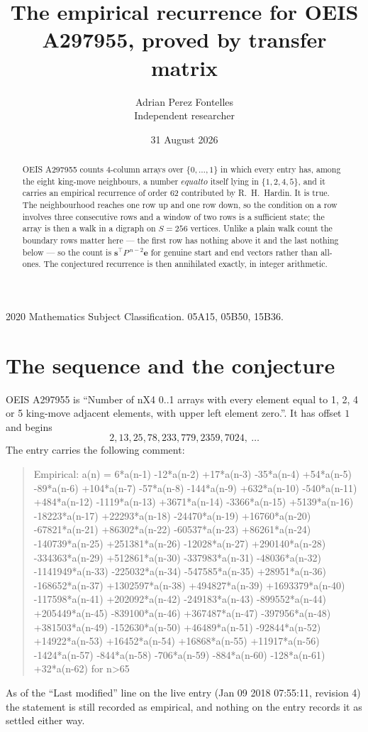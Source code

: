 \documentclass[11pt,a4paper]{article}
\title{The empirical recurrence for OEIS A297955, proved by transfer matrix}
\author{Adrian Perez Fontelles\\ \small Independent researcher}
\date{31 August 2026}
\theoremstyle{plain}
\theoremstyle{definition}
\begin{document}
\maketitle

\begin{abstract}
OEIS A297955 counts $4$-column arrays over $\{0,\dots,1\}$ in which every entry has,
among the eight king-move neighbours, a number $equal to$ itself lying in $\{1,2,4,5\}$, and it carries an empirical
recurrence of order $62$ contributed by R.~H.~Hardin. It is true. The neighbourhood
reaches one row up and one row down, so the condition on a row involves three consecutive
rows and a window of two rows is a sufficient state; the array is then a walk in a digraph
on $S=256$ vertices. Unlike a plain walk count the boundary rows matter here --- the first
row has nothing above it and the last nothing below --- so the count is
$\mathbf{s}^{\!\top}P^{\,n-2}\mathbf{e}$ for genuine start and end vectors rather than
all-ones. The conjectured recurrence is then annihilated exactly, in integer arithmetic.
\end{abstract}

\noindent\small 2020 Mathematics Subject Classification. 05A15, 05B50, 15B36.\normalsize

\section{The sequence and the conjecture}

OEIS A297955 is ``Number of nX4 0..1 arrays with every element equal to 1, 2, 4 or 5 king-move adjacent elements, with upper left element zero.''. It has offset
$1$ and begins
\[
2, 13, 25, 78, 233, 779, 2359, 7024,\ \dots
\]
The entry carries the following comment:
\begin{quote}\small
Empirical: a(n) = 6*a(n-1) -12*a(n-2) +17*a(n-3) -35*a(n-4) +54*a(n-5) -89*a(n-6) +104*a(n-7) -57*a(n-8) -144*a(n-9) +632*a(n-10) -540*a(n-11) +484*a(n-12) -1119*a(n-13) +3671*a(n-14) -3366*a(n-15) +5139*a(n-16) -18223*a(n-17) +22293*a(n-18) -24470*a(n-19) +16760*a(n-20) -67821*a(n-21) +86302*a(n-22) -60537*a(n-23) +86261*a(n-24) -140739*a(n-25) +251381*a(n-26) -12028*a(n-27) +290140*a(n-28) -334363*a(n-29) +512861*a(n-30) -337983*a(n-31) -48036*a(n-32) -1141949*a(n-33) -225032*a(n-34) -547585*a(n-35) +28951*a(n-36) -168652*a(n-37) +1302597*a(n-38) +494827*a(n-39) +1693379*a(n-40) -117598*a(n-41) +202092*a(n-42) -249183*a(n-43) -899552*a(n-44) +205449*a(n-45) -839100*a(n-46) +367487*a(n-47) -397956*a(n-48) +381503*a(n-49) -152630*a(n-50) +46489*a(n-51) -92844*a(n-52) +14922*a(n-53) +16452*a(n-54) +16868*a(n-55) +11917*a(n-56) -1424*a(n-57) -844*a(n-58) -706*a(n-59) -884*a(n-60) -128*a(n-61) +32*a(n-62) for n>65
\end{quote}
As of the ``Last modified'' line on the live entry (Jan 09 2018 07:55:11, revision
4) the statement is still recorded as empirical, and nothing on the entry
records it as settled either way.
\end{document}
